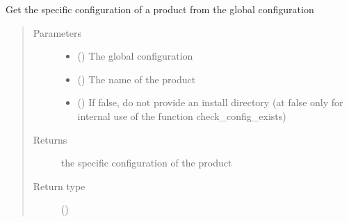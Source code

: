 \documentclass[a4paper,10pt,english]{sphinxmanual}
\begin{document}
\begin{fulllineitems}
\label{\detokenize{commands/apidoc/src:src.product.get_product_config}}
Get the specific configuration of a product from the global configuration
\begin{quote}\begin{description}
\item[{Parameters}] \leavevmode\begin{itemize}
\item {} 
 () \textendash{} The global configuration

\item {} 
 () \textendash{} The name of the product

\item {} 
 () \textendash{} If false, do not provide an install 
directory (at false only for internal use 
of the function check\_config\_exists)

\end{itemize}

\item[{Returns}] \leavevmode
the specific configuration of the product

\item[{Return type}] \leavevmode
{\hyperref[\detokenize{commands/apidoc/src:src.pyconf.Config}]{}} ()

\end{description}\end{quote}

\end{fulllineitems}

\end{document}
